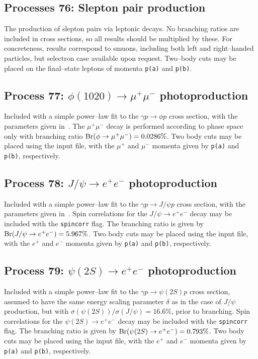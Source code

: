 \documentclass[12pt]{article}
\begin{document}
\subsection{Processes 76: Slepton pair production}

The production of slepton pairs via leptonic decays. No branching ratios are included in cross sections, so all results should be multiplied by these. For concreteness, results correspond to smuons, including both left and right--handed particles, but selectron case available upon request. Two--body cuts may be placed on the final--state leptons of momenta  \texttt{p(a)} and \texttt{p(b)}. 

\subsection{Process 77: $\phi(1020)\to \mu^+\mu^-$ photoproduction}

Included with a simple power--law fit to the $\gamma p\to \phi p$ cross section, with the parameters given in~\cite{Harland-Lang:2015cta}. The $\mu^+\mu^-$ decay is performed according to phase space only with branching ratio ${\rm Br}(\phi \to \mu^+\mu^-)=0.0286\%$. Two body cuts may be placed using the input file, with the $\mu^+$ and $\mu^-$  momenta given by \texttt{p(a)} and \texttt{p(b)}, respectively.

\subsection{Process 78: $J/\psi\to e^+e^-$ photoproduction}

Included with a simple power--law fit to the $\gamma p\to J/\psi p$ cross section, with the parameters given in~\cite{Harland-Lang:2015cta}. Spin correlations for the $J/\psi\to e^+ e^-$ decay may be included with the \texttt{spincorr} flag. The branching ratio is given by ${\rm Br}(J/\psi \to e^+ e^-)=5.967\%$. Two body cuts may be placed using the input file, with the $e^+$ and $e^-$  momenta given by \texttt{p(a)} and \texttt{p(b)}, respectively.

\subsection{Process 79: $\psi(2S)\to e^+ e^-$ photoproduction}

Included with a simple power--law fit to the $\gamma p\to \psi(2S) p$ cross section, assumed to have the same energy scaling parameter $\delta$ as in the case of $J/\psi$ production, but with $\sigma(\psi(2S))/\sigma(J/\psi)=16.6\%$, prior to branching. Spin correlations for the $\psi(2S)\to e^+ e^-$ decay may be included with the \texttt{spincorr} flag. The branching ratio is given by ${\rm Br}(\psi(2S) \to e^+ e^-)=0.793\%$. Two body cuts may be placed using the input file, with the $e^+$ and $e^-$ momenta given by \texttt{p(a)} and \texttt{p(b)}, respectively.
\end{document}
